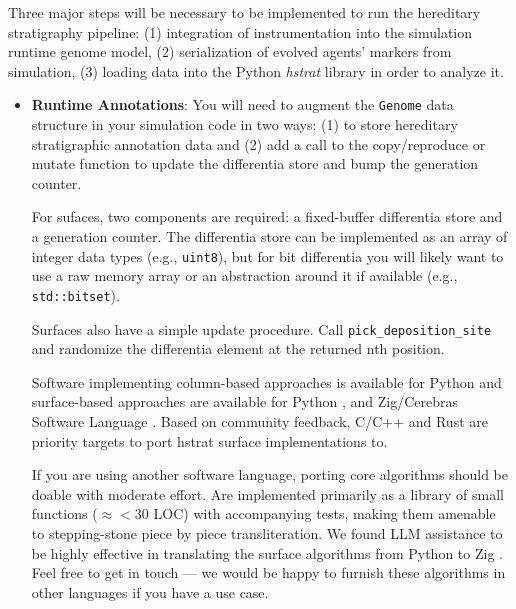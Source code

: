 Three major steps will be necessary to be implemented to run the hereditary stratigraphy pipeline: (1) integration of instrumentation into the simulation runtime genome model, (2) serialization of evolved agents' markers from simulation, (3) loading data into the Python \textit{hstrat} library in order to analyze it.

\begin{itemize}
\item \textbf{Runtime Annotations}:
You will need to augment the \texttt{Genome} data structure in your simulation code in two ways: (1) to store hereditary stratigraphic annotation data and (2) add a call to the copy/reproduce or mutate function to update the differentia store and bump the generation counter.

For sufaces, two components are required: a fixed-buffer differentia store and a generation counter.
The differentia store can be implemented as an array of integer data types (e.g., \texttt{uint8}), but for bit differentia you will likely want to use a raw memory array or an abstraction around it if available (e.g., \texttt{std::bitset}).

Surfaces also have a simple update procedure.
Call \texttt{pick\_deposition\_site} and randomize the differentia element at the returned nth position.

Software implementing column-based approaches is available for Python \citep{moreno2022hstrat} and surface-based approaches are available for Python \citep{TODO}, and Zig/Cerebras Software Language \citep{TODO}.
Based on community feedback, C/C++ and Rust are priority targets to port hstrat surface implementations to.

If you are using another software language, porting core algorithms should be doable with moderate effort.
Are implemented primarily as a library of small functions ($\approx<30$ LOC) with accompanying tests, making them amenable to stepping-stone piece by piece transliteration.
We found LLM assistance to be highly effective in translating the surface algorithms from Python to Zig \citep{TODO}.
Feel free to get in touch --- we would be happy to furnish these algorithms in other languages if you have a use case.
\end{itemize}


